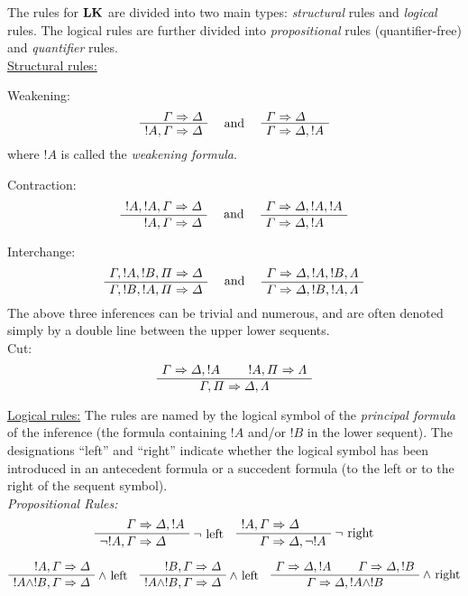 \documentclass[open-logic-section]{subfiles}
\begin{document}
The rules for $\mathbf{LK}$ are divided into two main types: \emph{structural} rules and \emph{logical} rules. The logical rules are further divided into \emph{propositional} rules (quantifier-free) and \emph{quantifier} rules.\\ 

\underline{Structural rules:}

Weakening:
\[
\Axiom$ \Gamma \fCenter \Delta $
\UnaryInf$ !A, \Gamma \fCenter \Delta$
\DisplayProof
\quad
\textrm{  and  }
\quad
\Axiom$ \Gamma \fCenter \Delta$
\UnaryInf$ \Gamma \fCenter \Delta, !A$
\DisplayProof
\]
where $!A$ is called the \emph{weakening formula}.

Contraction:
\[
\Axiom$ !A, !A, \Gamma \fCenter \Delta $
\UnaryInf$ !A, \Gamma \fCenter \Delta $
\DisplayProof
\quad
\textrm{  and  }
\quad
\Axiom$ \Gamma \fCenter \Delta, !A, !A $
\UnaryInf$ \Gamma \fCenter \Delta, !A$
\DisplayProof
\]

Interchange:
\[
\Axiom$ \Gamma, !A, !B, \Pi \fCenter \Delta $
\UnaryInf$ \Gamma, !B, !A, \Pi \fCenter \Delta$
\DisplayProof
\quad
\textrm{  and  }
\quad
\Axiom$ \Gamma \fCenter \Delta, !A, !B, \Lambda $
\UnaryInf$ \Gamma \fCenter \Delta, !B, !A, \Lambda$
\DisplayProof
\]
The above three inferences can be trivial and numerous, and are  often denoted simply by a double line between the upper lower sequents.\\

Cut:
\[
\Axiom$ \Gamma \fCenter \Delta, !A$
\Axiom$ !A, \Pi \fCenter \Lambda $
\BinaryInf$ \Gamma, \Pi \fCenter \Delta, \Lambda$
\DisplayProof
\]

\underline{Logical rules:}
The rules are named by the logical symbol of the \emph{principal formula} of the inference (the formula containing $!A$ and/or $!B$ in the lower sequent). The designations ``left'' and ``right'' indicate whether the logical symbol has been introduced in an antecedent formula or a succedent formula (to the left or to the right of the sequent symbol).\\

\emph{Propositional Rules:}
\[
\Axiom$ \Gamma \fCenter \Delta, !A $
\RightLabel{$\lnot$ left}
\UnaryInf$ \lnot !A, \Gamma \fCenter \Delta$
\DisplayProof
\quad
\Axiom$!A, \Gamma \fCenter \Delta$
\RightLabel{$\lnot$ right}
\UnaryInf$ \Gamma \fCenter \Delta, \lnot !A $
\DisplayProof
\]

\[
\Axiom$ !A, \Gamma \fCenter \Delta$
\RightLabel{$\land$ left}
\UnaryInf$ !A \land !B, \Gamma \fCenter \Delta$
\DisplayProof
\quad
\Axiom$!B, \Gamma \fCenter \Delta$
\RightLabel{$\land$ left}
\UnaryInf$!A \land !B, \Gamma \fCenter \Delta$
\DisplayProof
\quad
\Axiom$\Gamma \fCenter \Delta, !A$
\Axiom$ \Gamma \fCenter \Delta, !B$
\RightLabel{$\land$ right}
\BinaryInf$ \Gamma \fCenter \Delta, !A \land !B $
\DisplayProof
\]
\end{document}
